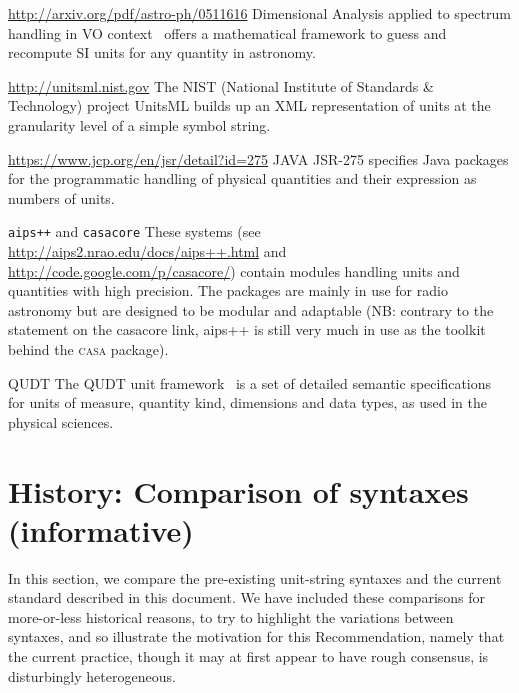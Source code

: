 \documentclass[11pt,a4paper]{ivoa}
\newcommand{\violet}{\textcolor[rgb]{0.50,0.00,0.50}}
\begin{document}
\begin{bigdescription}
\item[\url{http://arxiv.org/pdf/astro-ph/0511616}]
Dimensional Analysis applied to spectrum handling in VO context~\citep{osuna05}
offers a mathematical framework to guess and recompute
SI units for any quantity in astronomy.

\item[\url{http://unitsml.nist.gov}]
The NIST (National Institute of Standards \& Technology) project
UnitsML builds up an XML representation of units at the granularity
level of a simple symbol string.

\item[\url{https://www.jcp.org/en/jsr/detail?id=275}]
JAVA JSR-275 specifies Java packages for the programmatic
handling of physical quantities and their expression as numbers of
units.
\item[\texttt{aips++} and \texttt{casacore}]
These systems (see \url{http://aips2.nrao.edu/docs/aips++.html} and
 \url{http://code.google.com/p/casacore/}) contain modules handling
 units and quantities with high precision. The packages are mainly in use for
radio astronomy but are designed to be modular and adaptable (NB:
contrary to the statement on the casacore link, aips++ is still very much in
use as the toolkit behind the \textsc{casa} package).
\item[QUDT] The QUDT unit framework~\citep{qudt} is a set of detailed
  semantic specifications for units of measure, quantity kind,
  dimensions and data types, as used in the physical sciences.
\end{bigdescription}
\clearpage
\section{History: Comparison of syntaxes (informative)\label{appx:comparisons}}

In this section, we compare the pre-existing unit-string syntaxes and the
current standard described in this document.
We have included these comparisons for
more-or-less historical reasons, to try to highlight the variations
between syntaxes, and so illustrate the motivation for this
Recommendation, namely that the current practice, though it may at
first appear to have rough consensus, is disturbingly heterogeneous.
\end{document}
